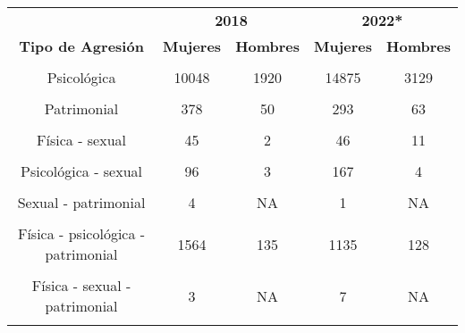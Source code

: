\begin{tabular}[t]{ccccc}
\toprule
\multicolumn{1}{c}{\textbf{ }} & \multicolumn{2}{c}{\textbf{2018}} & \multicolumn{2}{c}{\textbf{2022*}} \\
\cmidrule(l{3pt}r{3pt}){2-3} \cmidrule(l{3pt}r{3pt}){4-5}
\textbf{Tipo de Agresión} & \textbf{Mujeres} & \textbf{Hombres} & \textbf{Mujeres} & \textbf{Hombres}\\
\midrule
\cellcolor[HTML]{B6B3FF}{Física} & \cellcolor[HTML]{B6B3FF}{3178} & \cellcolor[HTML]{B6B3FF}{305} & \cellcolor[HTML]{B6B3FF}{3247} & \cellcolor[HTML]{B6B3FF}{488}\\
Psicológica & 10048 & 1920 & 14875 & 3129\\
\cellcolor[HTML]{B6B3FF}{Sexual} & \cellcolor[HTML]{B6B3FF}{119} & \cellcolor[HTML]{B6B3FF}{6} & \cellcolor[HTML]{B6B3FF}{75} & \cellcolor[HTML]{B6B3FF}{14}\\
Patrimonial & 378 & 50 & 293 & 63\\
\cellcolor[HTML]{B6B3FF}{Física - psicológica} & \cellcolor[HTML]{B6B3FF}{9115} & \cellcolor[HTML]{B6B3FF}{1022} & \cellcolor[HTML]{B6B3FF}{10134} & \cellcolor[HTML]{B6B3FF}{1332}\\
Física - sexual & 45 & 2 & 46 & 11\\
\cellcolor[HTML]{B6B3FF}{Física - patrimonial} & \cellcolor[HTML]{B6B3FF}{48} & \cellcolor[HTML]{B6B3FF}{5} & \cellcolor[HTML]{B6B3FF}{47} & \cellcolor[HTML]{B6B3FF}{15}\\
Psicológica - sexual & 96 & 3 & 167 & 4\\
\cellcolor[HTML]{B6B3FF}{Psicológica - patrimonial} & \cellcolor[HTML]{B6B3FF}{1349} & \cellcolor[HTML]{B6B3FF}{282} & \cellcolor[HTML]{B6B3FF}{1459} & \cellcolor[HTML]{B6B3FF}{270}\\
Sexual - patrimonial & 4 & NA & 1 & NA\\
\cellcolor[HTML]{B6B3FF}{Física - psicológica - sexual} & \cellcolor[HTML]{B6B3FF}{180} & \cellcolor[HTML]{B6B3FF}{6} & \cellcolor[HTML]{B6B3FF}{169} & \cellcolor[HTML]{B6B3FF}{2}\\
Física - psicológica - patrimonial & 1564 & 135 & 1135 & 128\\
\cellcolor[HTML]{B6B3FF}{Psicológica - sexual - patrimonial} & \cellcolor[HTML]{B6B3FF}{12} & \cellcolor[HTML]{B6B3FF}{NA} & \cellcolor[HTML]{B6B3FF}{11} & \cellcolor[HTML]{B6B3FF}{NA}\\
Física - sexual - patrimonial & 3 & NA & 7 & NA\\
\cellcolor[HTML]{B6B3FF}{Física - psicológica - sexual - patrimonial} & \cellcolor[HTML]{B6B3FF}{115} & \cellcolor[HTML]{B6B3FF}{2} & \cellcolor[HTML]{B6B3FF}{72} & \cellcolor[HTML]{B6B3FF}{NA}\\
\bottomrule
\end{tabular}
